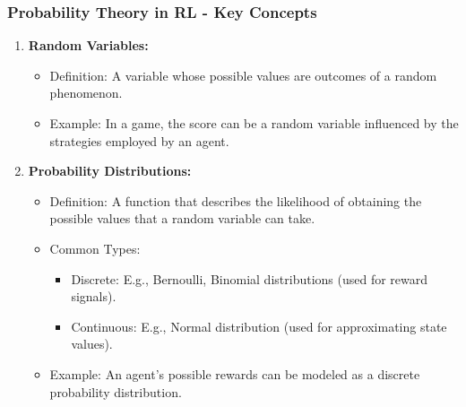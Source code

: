 \documentclass[aspectratio=169]{beamer}
\begin{document}
\begin{frame}[fragile]
    \frametitle{Probability Theory in RL - Key Concepts}
    \begin{enumerate}
        \item \textbf{Random Variables:}
            \begin{itemize}
                \item Definition: A variable whose possible values are outcomes of a random phenomenon.
                \item Example: In a game, the score can be a random variable influenced by the strategies employed by an agent.
            \end{itemize}
        \item \textbf{Probability Distributions:}
            \begin{itemize}
                \item Definition: A function that describes the likelihood of obtaining the possible values that a random variable can take.
                \item Common Types:
                    \begin{itemize}
                        \item Discrete: E.g., Bernoulli, Binomial distributions (used for reward signals).
                        \item Continuous: E.g., Normal distribution (used for approximating state values).
                    \end{itemize}
                \item Example: An agent's possible rewards can be modeled as a discrete probability distribution.
            \end{itemize}
    \end{enumerate}
\end{frame}
\end{document}
